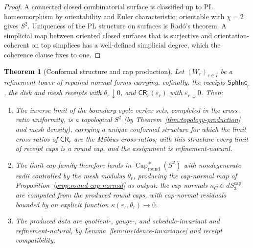 \documentclass[11pt]{article}
\newtheorem{theorem}{Theorem}[section]
\begin{document}
\begin{proof}
A connected closed combinatorial surface is classified up to PL homeomorphism
by orientability and Euler characteristic; orientable with \(\chi=2\) gives
\(S^2\). Uniqueness of the PL structure on surfaces is Rad\'o's theorem. A
simplicial map between oriented closed surfaces that is surjective and
orientation-coherent on top simplices has a well-defined simplicial degree,
which the coherence clause fixes to one.
\end{proof}

\begin{theorem}[Conformal structure and cap production]
\label{thm:conformal-cap-production}
Let \((W_r)_{r\in I}\) be a refinement tower of repaired normal forms carrying,
cofinally, the receipts
\(\mathsf{SphInc}_r\), the disk and mesh receipts with \(\theta_r\downarrow0\),
and \(\mathsf{CR}_r(\varepsilon_r)\) with \(\varepsilon_r\downarrow0\). Then:
\begin{enumerate}[leftmargin=2em]
\item The inverse limit of the boundary-cycle vertex sets, completed in the
cross-ratio uniformity, is a topological \(S^2\) (by
Theorem~\ref{thm:topology-production} and mesh density), carrying a unique
conformal structure for which the limit cross-ratios of
\(\mathsf{CR}_r\) are the M\"obius cross-ratios; with this structure every
limit of receipt caps is a round cap, and the assignment is refinement-natural.
\item The limit cap family therefore lands in
\(\operatorname{Cap}^{\mathrm{or}}_{\mathrm{round}}(S^2)\) with nondegenerate
radii controlled by the mesh modulus \(\theta_r\), producing the cap-normal
map of Proposition~\ref{prop:round-cap-normal} \emph{as output}: the cap
normals \(n_C\in dS_3^{\mathrm{cap}}\) are computed from the produced round
caps, with cap-normal residuals bounded by an explicit function
\(\kappa(\varepsilon_r,\theta_r)\to0\).
\item The produced data are quotient-, gauge-, and schedule-invariant and
refinement-natural, by Lemma~\ref{lem:incidence-invariance} and receipt
compatibility.
\end{enumerate}
\end{theorem}
\end{document}
